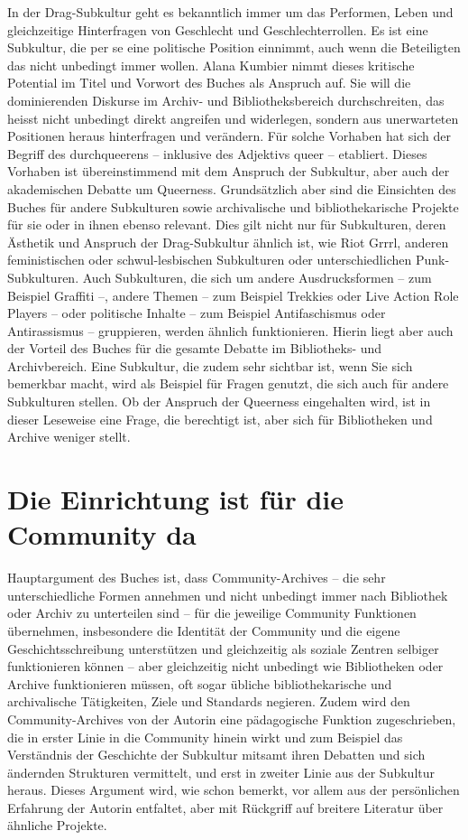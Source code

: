 \documentclass[a4paper,
fontsize=11pt,
oneside,
numbers=noperiodatend,
parskip=half-,
bibliography=totoc,
final
]{scrartcl}
\begin{document}
In der Drag-Subkultur geht es bekanntlich immer um das Performen, Leben
und gleichzeitige Hinterfragen von Geschlecht und Geschlechterrollen. Es
ist eine Subkultur, die per se eine politische Position einnimmt, auch
wenn die Beteiligten das nicht unbedingt immer wollen. Alana Kumbier
nimmt dieses kritische Potential im Titel und Vorwort des Buches als
Anspruch auf. Sie will die dominierenden Diskurse im Archiv- und
Bibliotheksbereich durchschreiten, das heisst nicht unbedingt direkt
angreifen und widerlegen, sondern aus unerwarteten Positionen heraus
hinterfragen und verändern. Für solche Vorhaben hat sich der Begriff des
durchqueerens -- inklusive des Adjektivs queer -- etabliert. Dieses
Vorhaben ist übereinstimmend mit dem Anspruch der Subkultur, aber auch
der akademischen Debatte um Queerness. Grundsätzlich aber sind die
Einsichten des Buches für andere Subkulturen sowie archivalische und
bibliothekarische Projekte für sie oder in ihnen ebenso relevant. Dies
gilt nicht nur für Subkulturen, deren Ästhetik und Anspruch der
Drag-Subkultur ähnlich ist, wie Riot Grrrl, anderen feministischen oder
schwul-lesbischen Subkulturen oder unterschiedlichen Punk-Subkulturen.
Auch Subkulturen, die sich um andere Ausdrucksformen -- zum Beispiel
Graffiti --, andere Themen -- zum Beispiel Trekkies oder Live Action
Role Players -- oder politische Inhalte -- zum Beispiel Antifaschismus
oder Antirassismus -- gruppieren, werden ähnlich funktionieren. Hierin
liegt aber auch der Vorteil des Buches für die gesamte Debatte im
Bibliotheks- und Archivbereich. Eine Subkultur, die zudem sehr sichtbar
ist, wenn Sie sich bemerkbar macht, wird als Beispiel für Fragen
genutzt, die sich auch für andere Subkulturen stellen. Ob der Anspruch
der Queerness eingehalten wird, ist in dieser Leseweise eine Frage, die
berechtigt ist, aber sich für Bibliotheken und Archive weniger stellt.

\section*{Die Einrichtung ist für die Community
da}\label{die-einrichtung-ist-fuxfcr-die-community-da}

Hauptargument des Buches ist, dass Community-Archives -- die sehr
unterschiedliche Formen annehmen und nicht unbedingt immer nach
Bibliothek oder Archiv zu unterteilen sind -- für die jeweilige
Community Funktionen übernehmen, insbesondere die Identität der
Community und die eigene Geschichtsschreibung unterstützen und
gleichzeitig als soziale Zentren selbiger funktionieren können -- aber
gleichzeitig nicht unbedingt wie Bibliotheken oder Archive funktionieren
müssen, oft sogar übliche bibliothekarische und archivalische
Tätigkeiten, Ziele und Standards negieren. Zudem wird den
Community-Archives von der Autorin eine pädagogische Funktion
zugeschrieben, die in erster Linie in die Community hinein wirkt und zum
Beispiel das Verständnis der Geschichte der Subkultur mitsamt ihren
Debatten und sich ändernden Strukturen vermittelt, und erst in zweiter
Linie aus der Subkultur heraus. Dieses Argument wird, wie schon bemerkt,
vor allem aus der persönlichen Erfahrung der Autorin entfaltet, aber mit
Rückgriff auf breitere Literatur über ähnliche Projekte.
\end{document}
